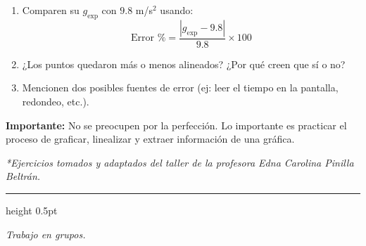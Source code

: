 \documentclass[11pt, letterpaper]{article}
\begin{document}
	\begin{enumerate}
		\item Comparen su $g_{\text{exp}}$ con $9.8$ m/s$^2$ usando:
		\[
		\text{Error \%} = \frac{|g_{\text{exp}} - 9.8|}{9.8} \times 100
		\]
		
		\item ¿Los puntos quedaron más o menos alineados? ¿Por qué creen que sí o no?
		
		\item Mencionen dos posibles fuentes de error (ej: leer el tiempo en la pantalla, redondeo, etc.).
	\end{enumerate}
	
	\vspace{1cm}
	\noindent
	\textbf{Importante:} No se preocupen por la perfección. Lo importante es practicar el proceso de graficar, linealizar y extraer información de una gráfica.
	
	\begin{center}
		\small\textit{*Ejercicios tomados y adaptados del taller de la profesora Edna Carolina Pinilla Beltrán.}
	\end{center}
	
	\vspace{0.5cm}
	{\color{UnalGreen}\hrule height 0.5pt}
	\begin{center}
		\small 
		\textit{Trabajo en grupos.}
	\end{center}
	
\end{document}

